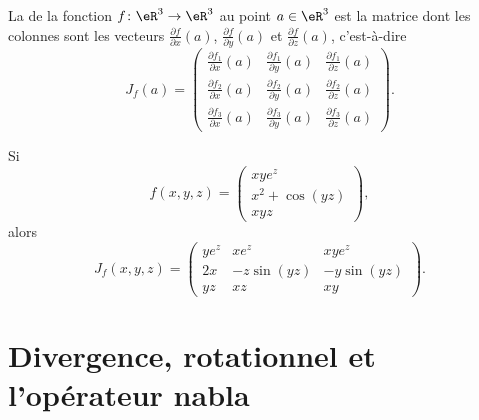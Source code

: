 La  de la fonction $f\colon \eR^3\to \eR^3$ au point $a\in\eR^3$ est la matrice dont les colonnes sont les vecteurs $\frac{ \partial f }{ \partial x }(a)$, $\frac{ \partial f }{ \partial y }(a)$ et $\frac{ \partial f }{ \partial z }(a)$, c'est-à-dire
\begin{equation}
    J_f(a)=\begin{pmatrix}
        \frac{ \partial f_1 }{ \partial x }(a)   &   \frac{ \partial f_1 }{ \partial y }(a)    &   \frac{ \partial f_1 }{ \partial z }(a)    \\
        \frac{ \partial f_2 }{ \partial x }(a)   &   \frac{ \partial f_2 }{ \partial y }(a)    &   \frac{ \partial f_2 }{ \partial z }(a)    \\
        \frac{ \partial f_3 }{ \partial x }(a)   &   \frac{ \partial f_3 }{ \partial y }(a)    &   \frac{ \partial f_3 }{ \partial z }(a)
    \end{pmatrix}.
\end{equation}

\begin{example}
    Si
    \begin{equation}
        f(x,y,z)=\begin{pmatrix}
            xy e^{z}    \\
            x^2+\cos(yz)    \\
            xyz
        \end{pmatrix},
    \end{equation}
    alors
    \begin{equation}
        J_f(x,y,z)=\begin{pmatrix}
            ye^z    &   xe^z    &   xye^z    \\
            2x    &   -z\sin(yz)    &   -y\sin(yz)    \\
            yz    &   xz    &   xy
        \end{pmatrix}.
    \end{equation}
\end{example}

\section{Divergence, rotationnel et l'opérateur nabla}


